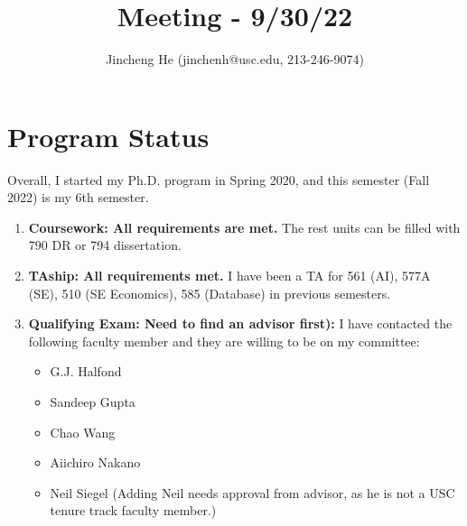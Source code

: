\documentclass{article}
\title{Meeting - 9/30/22}
\author{Jincheng He (jinchenh@usc.edu, 213-246-9074)}
\date{}
\begin{document}
\maketitle

\section*{Program Status}
Overall, I started my Ph.D. program in Spring 2020, and this semester (Fall 2022) is my 6th semester. 
\begin{enumerate}

\item \textbf{Coursework: All requirements are met.} 
The rest units can be filled with 790 DR or 794 dissertation.

\item \textbf{TAship: All requirements met.} I have been a TA for 561 (AI), 577A (SE), 510 (SE Economics), 585 (Database) in previous semesters.

\item \textbf{Qualifying Exam: Need to find an advisor first):} I have contacted the following faculty member and they are willing to be on my committee:

\begin{itemize}
    \item G.J. Halfond
    \item Sandeep Gupta
    \item Chao Wang
    \item Aiichiro Nakano 
    \item Neil Siegel (Adding Neil needs approval from advisor, as he is not a USC tenure track faculty member.)
\end{itemize}
\end{enumerate}
\end{document}
